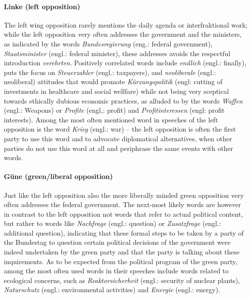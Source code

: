 \documentclass{article} %
\begin{document}
\paragraph{Linke (left opposition)} The left wing opposition rarely mentions the daily agenda or interfraktional work; while the left opposition very often addresses the government and the ministers, as indicated by the words {\em Bundesregierung} (eng.: federal government), {\em Staatsminister} (engl.: federal minister), these addresses avoids the respectful introduction {\em verehrten}. Positively correlated words include {\em endlich} (engl.: finally), puts the focus on {\em Steuerzahler} (engl.: taxpayers), and {\em neoliberale} (engl.: neoliberal) attitudes that would promote {\em K\"urzungspolitik} (engl: cutting of investments in healthcare and social wellfare) while not being very sceptical towards ethically dubious economic practices, as alluded to by the words {\em Waffen} (engl.: Weapons) or {\em Profite} (engl,: profit) and {\em Profitinteressen} (engl: profit interests). Among the most often mentioned word in speeches of the left opposition is the word {\em Krieg} (engl.: war) -- the left opposition is often the first party to use this word and to advocate diplomatical alternatives, when other parties do not use this word at all and periphrase the same events with other words. 

\paragraph{G\"une (green/liberal opposition)}
Just like the left opposition also the more liberally minded green opposition very often addresses the federal government. The next-most likely words are however in contrast to the left opposition not words that refer to actual political content, but rather to words like {\em Nachfrage} (engl.: question) or {\em Zusatzfrage} (engl.: additional question), indicating that these formal steps to be taken by a party of the Bundestag to question certain political decisions of the government were indeed undertaken by the green party and that the party is talking about these inquirements. As to be expected from the political program of the green party, among the most often used words in their speeches include words related to ecological concerns, such as {\em Reaktorsicherheit} (engl.: security of nuclear plants), {\em Naturschutz} (engl.: environmental activities) and {\em Energie} (engl.: energy). 
\end{document}
